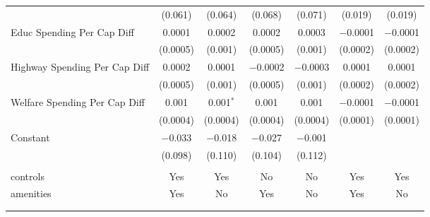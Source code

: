 \begin{table}[!htbp]
\begin{tabular}{@{\extracolsep{5pt}}lcccccc}
  & (0.061) & (0.064) & (0.068) & (0.071) & (0.019) & (0.019) \\ 
  Educ Spending Per Cap Diff & 0.0001 & 0.0002 & 0.0002 & 0.0003 & $-$0.0001 & $-$0.0001 \\ 
  & (0.0005) & (0.001) & (0.0005) & (0.001) & (0.0002) & (0.0002) \\ 
  Highway Spending Per Cap Diff & 0.0002 & 0.0001 & $-$0.0002 & $-$0.0003 & 0.0001 & 0.0001 \\ 
  & (0.0005) & (0.001) & (0.0005) & (0.001) & (0.0002) & (0.0002) \\ 
  Welfare Spending Per Cap Diff & 0.001 & 0.001$^{*}$ & 0.001 & 0.001 & $-$0.0001 & $-$0.0001 \\ 
  & (0.0004) & (0.0004) & (0.0004) & (0.0004) & (0.0001) & (0.0001) \\ 
  Constant & $-$0.033 & $-$0.018 & $-$0.027 & $-$0.001 &  &  \\ 
  & (0.098) & (0.110) & (0.104) & (0.112) &  &  \\ 
 \hline \\[-1.8ex] 
controls & Yes & Yes & No & No & Yes & Yes \\ 
amenities & Yes & No & Yes & No & Yes & No \\ 
\hline \\[-1.8ex] 
\hline 
\hline \\[-1.8ex] 
\end{tabular} 
\end{table} 
